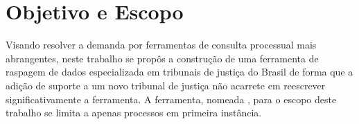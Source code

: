 \section{Objetivo e Escopo}

Visando resolver a demanda por ferramentas de consulta processual mais
abrangentes, neste trabalho se propôs a construção de uma ferramenta de
raspagem de dados especializada em tribunais de justiça do Brasil de forma que
a adição de suporte a um novo tribunal de justiça não acarrete em reescrever
significativamente a ferramenta. A ferramenta, nomeada \textbf{\tjscraper},
para o escopo deste trabalho se limita a apenas processos em primeira
instância.
